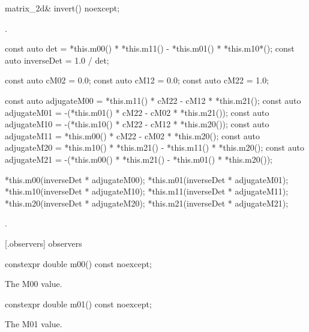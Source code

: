 \begin{itemdecl}
matrix_2d& invert() noexcept;
\end{itemdecl}
\begin{itemdescr}
\pnum
\requires
{}.

\pnum
\effects
\begin{codeblock}
const auto det = *this.m00() * *this.m11() - *this.m01() * *this.m10*();
const auto inverseDet = 1.0 / det;

const auto cM02 = 0.0;
const auto cM12 = 0.0;
const auto cM22 = 1.0;

const auto adjugateM00 =   *this.m11() * cM22 - cM12 * *this.m21();
const auto adjugateM01 = -(*this.m01() * cM22 - cM02 * *this.m21());
const auto adjugateM10 = -(*this.m10() * cM22 - cM12 * *this.m20());
const auto adjugateM11 =   *this.m00() * cM22 - cM02 * *this.m20();
const auto adjugateM20 =   *this.m10() * *this.m21() - *this.m11() * 
  *this.m20();
const auto adjugateM21 = -(*this.m00() * *this.m21() - *this.m01() * 
  *this.m20());

*this.m00(inverseDet * adjugateM00);
*this.m01(inverseDet * adjugateM01);
*this.m10(inverseDet * adjugateM10);
*this.m11(inverseDet * adjugateM11);
*this.m20(inverseDet * adjugateM20);
*this.m21(inverseDet * adjugateM21);
\end{codeblock}

\pnum
\returns
{}.
\end{itemdescr}

 [\matrixtwod.observers] { observers}

\begin{itemdecl}
constexpr double m00() const noexcept;
\end{itemdecl}
\begin{itemdescr}
\pnum
\returns
The M00 value.
\end{itemdescr}

\begin{itemdecl}
constexpr double m01() const noexcept;
\end{itemdecl}
\begin{itemdescr}
\pnum
\returns
The M01 value.
\end{itemdescr}

